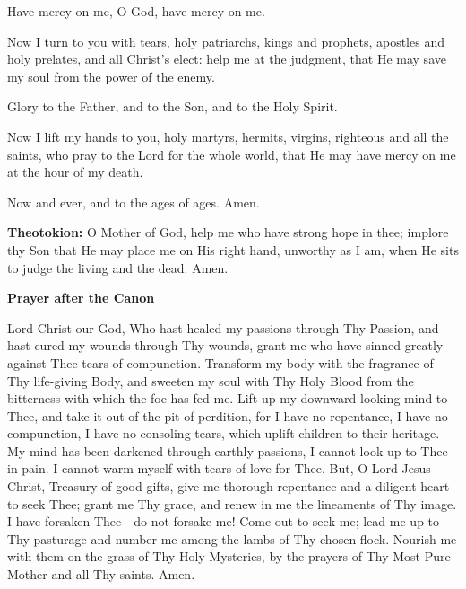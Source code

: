 Have mercy on me, O God, have mercy on me.

Now I turn to you with tears, holy patriarchs, kings and prophets,
apostles and holy prelates, and all Christ's elect: help me at the
judgment, that He may save my soul from the power of the enemy.

Glory to the Father, and to the Son, and to the Holy Spirit.

Now I lift my hands to you, holy martyrs, hermits, virgins, righteous
and all the saints, who pray to the Lord for the whole world, that He
may have mercy on me at the hour of my death.

Now and ever, and to the ages of ages. Amen.

\textbf{Theotokion:} O Mother of God, help me who have strong hope in
thee; implore thy Son that He may place me on His right hand, unworthy
as I am, when He sits to judge the living and the dead. Amen.

\textbf{Prayer after the Canon}

Lord Christ our God, Who hast healed my passions through Thy Passion,
and hast cured my wounds through Thy wounds, grant me who have sinned
greatly against Thee tears of compunction. Transform my body with the
fragrance of Thy life-giving Body, and sweeten my soul with Thy Holy
Blood from the bitterness with which the foe has fed me. Lift up my
downward looking mind to Thee, and take it out of the pit of perdition,
for I have no repentance, I have no compunction, I have no consoling
tears, which uplift children to their heritage. My mind has been
darkened through earthly passions, I cannot look up to Thee in pain. I
cannot warm myself with tears of love for Thee. But, O Lord Jesus
Christ, Treasury of good gifts, give me thorough repentance and a
diligent heart to seek Thee; grant me Thy grace, and renew in me the
lineaments of Thy image. I have forsaken Thee - do not forsake me! Come
out to seek me; lead me up to Thy pasturage and number me among the
lambs of Thy chosen flock. Nourish me with them on the grass of Thy Holy
Mysteries, by the prayers of Thy Most Pure Mother and all Thy saints.
Amen.
